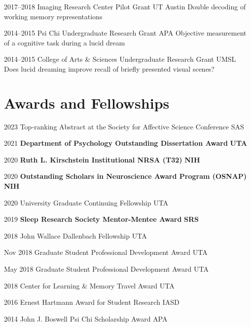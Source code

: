 \documentclass[11pt,a4paper,sans]{moderncv}
\begin{document}
\cventry
    {2017--2018}
    {Imaging Research Center Pilot Grant}
    {UT Austin}{}{}
    {Double decoding of working memory representations}

\cventry
    {2014--2015}
    {Psi Chi Undergraduate Research Grant}
    {APA}{}{}
    {Objective measurement of a cognitive task during a lucid dream}

\cventry
    {2014--2015}
    {College of Arts \& Sciences Undergraduate Research Grant}
    {UMSL}{}{}
    {Does lucid dreaming improve recall of briefly presented visual scenes?}

\section{Awards and Fellowships}

\cvitemwithcomment
{2023}
{Top-ranking Abstract at the Society for Affective Science Conference}
{SAS}

\cvitemwithcomment
{2021}
{\textbf{Department of Psychology Outstanding Dissertation Award}}
{\textbf{UTA}}

\cvitemwithcomment
{2020}
{\textbf{Ruth L. Kirschstein Institutional NRSA (T32)}}
{\textbf{NIH}}

\cvitemwithcomment
{2020}
{\textbf{Outstanding Scholars in Neuroscience Award Program (OSNAP)}}
{\textbf{NIH}}

\cvitemwithcomment
{2020}
{University Graduate Continuing Fellowship}
{UTA}

\cvitemwithcomment
{2019}
{\textbf{Sleep Research Society Mentor-Mentee Award}}
{\textbf{SRS}}

\cvitemwithcomment
{2018}
{John Wallace Dallenbach Fellowship}
{UTA}

\cvitemwithcomment
{Nov 2018}
{Graduate Student Professional Development Award}
{UTA}

\cvitemwithcomment
{May 2018}
{Graduate Student Professional Development Award}
{UTA}

\cvitemwithcomment
{2018}
{Center for Learning \& Memory Travel Award}
{UTA}

\cvitemwithcomment
{2016}
{Ernest Hartmann Award for Student Research}
{IASD}

\cvitemwithcomment
{2014}
{John J. Boswell Psi Chi Scholarship Award}
{APA}
\end{document}
